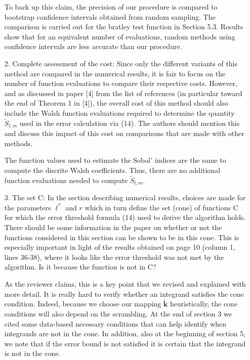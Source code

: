 \documentclass[10pt,a4paper]{article}
\newcommand{\vect}[1]{\boldsymbol{\mathbf{#1}}}
\newcommand{\vk}{\vect{k}}
\newcommand{\answer}[1]{{\color{blue} #1 }}
\begin{document}
\begin{itemize}
{To back up this claim, the precision of our procedure is compared to bootstrap confidence intervals obtained from random sampling. The comparison is carried out for the bratley test function in Section 5.3. Results show that for an equivalent number of evaluations, random methods using confidence intervals are less accurate than our procedure.}



\item[2.] Complete assessment of the cost: Since only the different variants of this method are compared in the numerical results, it is fair to focus on the number of function evaluations to compare their respective costs. However, and as discussed in paper [4] from the list of references (in particular toward the end of Theorem 1 in [4]), the overall cost of this method should also include the Walsh function evaluations required to determine the quantity $\widetilde{S}_{l,m}$ used in the error calculation via (14). The authors should mention this and discuss this impact of this cost on comparisons that are made with other methods.

\answer{The function values used to estimate the Sobol' indices are the same to compute the discrite Walsh coefficients. Thus, there are no additional function evaluations needed to compute $\widetilde{S}_{l,m}$. }

\item[3.]The set C: In the section describing numerical results, choices are made for the parameters $\ell^*$ and $r$ which in turn define the set (cone) of functions C for which the error threshold formula (14) used to derive the algorithm holds. There should be some information in the paper on whether or not the functions considered in this section can be shown to be in this cone. This is especially important in light of the results obtained on page 10 (column 1, lines 36-38), where it looks like the error threshold was not met by the algorithm. Is it because the function is not in C?

\answer{As the reviewer claims, this is a key point that we revised and explained with more detail. It is really hard to verify whether an integrand satisfies the cone condition. Indeed, because we choose our mapping $\tilde{\vk}$ heuristically, the cone conditions will also depend on the scrambling. At the end of section 3 we cited some data-based necessary conditions that can help identify when integrands are not in the cone. In addition, also at the beginning of section 5, we note that if the error bound is not satisfied it is certain that the integrand is not in the cone.}
\end{itemize}
\end{document}
